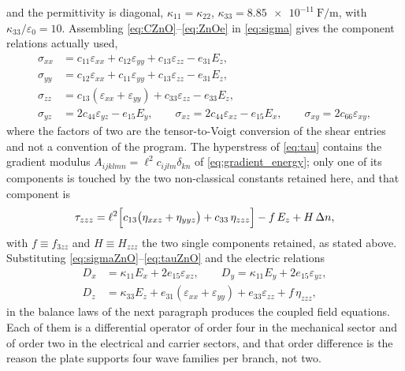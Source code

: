 and the permittivity is diagonal, $\kappa_{11}=\kappa_{22}$,
$\kappa_{33}=\SI{8.85e-11}{\farad\per\metre}$, with
$\kappa_{33}/\varepsilon_0=10$.  Assembling \eqref{eq:CZnO}--\eqref{eq:ZnOe} in
\eqref{eq:sigma} gives the component relations actually used,
\begin{equation}
\label{eq:sigmaZnO}
\begin{aligned}
\sigma_{xx}&=c_{11}\varepsilon_{xx}+c_{12}\varepsilon_{yy}
+c_{13}\varepsilon_{zz}-e_{31}E_z,\\
\sigma_{yy}&=c_{12}\varepsilon_{xx}+c_{11}\varepsilon_{yy}
+c_{13}\varepsilon_{zz}-e_{31}E_z,\\
\sigma_{zz}&=c_{13}(\varepsilon_{xx}+\varepsilon_{yy})
+c_{33}\varepsilon_{zz}-e_{33}E_z,\\
\sigma_{yz}&=2c_{44}\varepsilon_{yz}-e_{15}E_y,\qquad
\sigma_{xz}=2c_{44}\varepsilon_{xz}-e_{15}E_x,\qquad
\sigma_{xy}=2c_{66}\varepsilon_{xy},
\end{aligned}
\end{equation}
where the factors of two are the tensor-to-Voigt conversion of the shear
entries and not a convention of the program.  The hyperstress of
\eqref{eq:tau} contains the gradient modulus $A_{ijklmn}=\ell^2c_{ijlm}\delta_{kn}$
of \eqref{eq:gradient_energy}; only one of its components is touched by the two
non-classical constants retained here, and that component is
\begin{equation}
\label{eq:tauZnO}
\tau_{zzz}=\ell^{2}\Bigl[c_{13}\bigl(\eta_{xxz}+\eta_{yyz}\bigr)
+c_{33}\,\eta_{zzz}\Bigr]-f\,E_z+H\,\Delta n ,
\end{equation}
with $f\equiv f_{3zz}$ and $H\equiv H_{zzz}$ the two single components retained,
as stated above.  Substituting \eqref{eq:sigmaZnO}--\eqref{eq:tauZnO} and the
electric relations
\begin{equation}
\label{eq:DZnO}
\begin{aligned}
D_x&=\kappa_{11}E_x+2e_{15}\varepsilon_{xz},\qquad
D_y=\kappa_{11}E_y+2e_{15}\varepsilon_{yz},\\
D_z&=\kappa_{33}E_z+e_{31}(\varepsilon_{xx}+\varepsilon_{yy})
+e_{33}\varepsilon_{zz}+f\,\eta_{zzz},
\end{aligned}
\end{equation}
in the balance laws of the next paragraph produces the coupled field equations.
Each of them is a differential operator of order four in the mechanical sector
and of order two in the electrical and carrier sectors, and that order
difference is the reason the plate supports four wave families per branch, not two.


